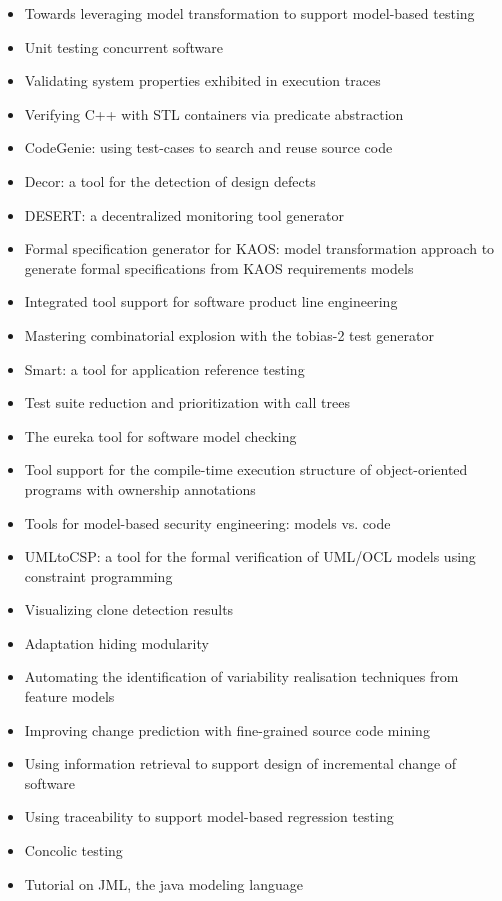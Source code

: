 {\begin{itemize}[itemsep=-1ex]
  \item Towards leveraging model transformation to support model-based testing
  \item Unit testing concurrent software
  \item Validating system properties exhibited in execution traces
  \item Verifying C++ with STL containers via predicate abstraction
  \item CodeGenie: using test-cases to search and reuse source code
  \item Decor: a tool for the detection of design defects
  \item DESERT: a decentralized monitoring tool generator
  \item Formal specification generator for KAOS: model transformation approach to generate formal specifications from KAOS requirements models
  \item Integrated tool support for software product line engineering
  \item Mastering combinatorial explosion with the tobias-2 test generator
  \item Smart: a tool for application reference testing
  \item Test suite reduction and prioritization with call trees
  \item The eureka tool for software model checking
  \item Tool support for the compile-time execution structure of object-oriented programs with ownership annotations
  \item Tools for model-based security engineering: models vs. code
  \item UMLtoCSP: a tool for the formal verification of UML/OCL models using constraint programming
  \item Visualizing clone detection results
  \item Adaptation hiding modularity
  \item Automating the identification of variability realisation techniques from feature models
  \item Improving change prediction with fine-grained source code mining
  \item Using information retrieval to support design of incremental change of software
  \item Using traceability to support model-based regression testing
  \item Concolic testing
  \item Tutorial on JML, the java modeling language

\end{itemize}}
